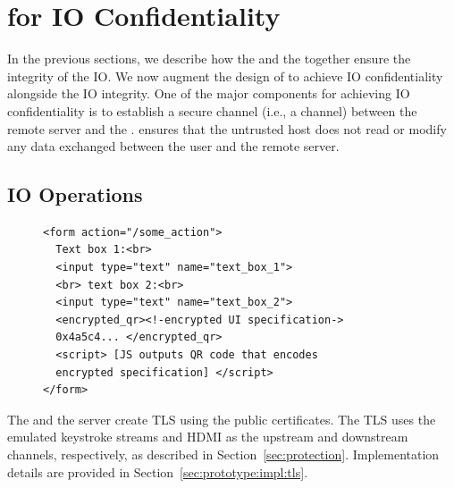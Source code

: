 \section{\name for IO Confidentiality}
\label{sec:confidentiality}


In the previous sections, we describe how the \name \js and the \device together ensure the integrity of the IO. We now augment the design of \name to achieve IO confidentiality alongside the IO integrity. One of the major components for achieving IO confidentiality is to establish a secure channel (i.e., a \tls channel) between the remote server and the \device. \tls ensures that the untrusted host does not read or modify any data exchanged between the user and the remote server.


\subsection{IO Operations}
\label{sec:confidentiality:io}

\begin{figure}[t]
\small
\begin{lstlisting}[mathescape=true]
<form action="/some_action">
  Text box 1:<br>
  <input type="text" name="text_box_1">
  <br> text box 2:<br>
  <input type="text" name="text_box_2">
  <encrypted_qr><!-encrypted UI specification->
  0x4a5c4... </encrypted_qr>
  <script> [JS outputs QR code that encodes 
  encrypted specification] </script>
</form> 
\end{lstlisting}

\end{figure}




 The \device and the server create TLS using the public certificates. The TLS uses the emulated keystroke streams and HDMI as the upstream and downstream channels, respectively, as described in Section~\ref{sec:protection}. Implementation details are provided in Section~\ref{sec:prototype:impl:tls}. 


